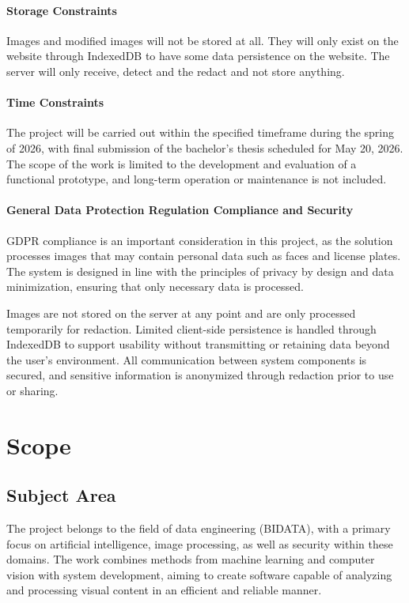 \paragraph{Storage Constraints}
Images and modified images will not be stored at all. They will only exist on the website through IndexedDB to have some data persistence on the website. The server will only receive, detect and the redact and not store anything.

\paragraph{Time Constraints}
The project will be carried out within the specified timeframe during the spring of 2026, with final submission of the bachelor's thesis scheduled for May 20, 2026. The scope of the work is limited to the development and evaluation of a functional prototype, and long-term operation or maintenance is not included.

\paragraph{General Data Protection Regulation Compliance and Security}
GDPR compliance is an important consideration in this project, as the solution processes images that may contain personal data such as faces and license plates. The system is designed in line with the principles of privacy by design and data minimization, ensuring that only necessary data is processed.

Images are not stored on the server at any point and are only processed temporarily for redaction. Limited client-side persistence is handled through IndexedDB to support usability without transmitting or retaining data beyond the user's environment. All communication between system components is secured, and sensitive information is anonymized through redaction prior to use or sharing.

\section{Scope}

\subsection{Subject Area}

The project belongs to the field of data engineering (BIDATA), with a primary focus on artificial intelligence, image processing, as well as security within these domains. The work combines methods from machine learning and computer vision with system development, aiming to create software capable of analyzing and processing visual content in an efficient and reliable manner.

